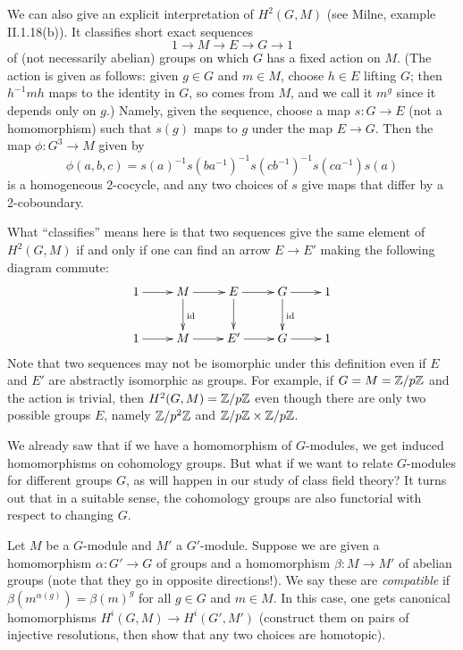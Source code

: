 
We can also give an explicit interpretation of $H^2(G,M)$ (see
Milne, example II.1.18(b)). It classifies
short exact sequences
\[
1 \to M \to E \to G \to 1
\]
of (not necessarily abelian) groups on which $G$ has a fixed action on $M$.
(The action is given as follows: given $g \in G$ and $m \in M$, choose $h
\in E$ lifting $G$; then $h^{-1}mh$ maps to the identity in $G$, so comes
from $M$, and we call it $m^g$ since it depends only on $g$.)
Namely, given the sequence, choose a map $s: G \to E$ (not a homomorphism)
such that $s(g)$ maps to $g$ under the map $E \to G$. Then the map
$\phi: G^3 \to M$ given by
\[
\phi(a,b,c) = s(a)^{-1} s(ba^{-1})^{-1} s(cb^{-1})^{-1} s(ca^{-1}) s(a)
\]
is a homogeneous 2-cocycle, and any two choices of $s$ give maps that differ by
a 2-coboundary.

What ``classifies'' means here is that two sequences give the same
element of $H^2(G,M)$ if and only if one can find an arrow $E \to E'$ making
the following diagram commute:
\[
\xymatrix{
1 \ar[r] & M \ar^{\id}[d] \ar[r] & E \ar[d] \ar[r] & G \ar^{\id}[d] \ar[r] &
1 \\
1 \ar[r] & M \ar[r] & E' \ar[r] & G \ar[r] & 1
}
\]
Note that two sequences may not be isomorphic under this definition even
if $E$ and $E'$ are abstractly isomorphic as groups. For example, if
$G = M = \mathbb{Z}/p\mathbb{Z}$ and the action is trivial, then $H^2(G, M) = \mathbb{Z}/p\mathbb{Z}$
even though there are only two possible groups $E$, namely $\mathbb{Z}/p^2\mathbb{Z}$
and $\mathbb{Z}/p\mathbb{Z} \times \mathbb{Z}/p\mathbb{Z}$.


We already saw that if we have a homomorphism of $G$-modules, we get
induced homomorphisms on cohomology groups.
 But what if we want to relate $G$-modules for different groups $G$,
as will happen in our study of class field theory? It turns out that in
a suitable sense, the cohomology groups are also functorial with respect to changing $G$.

Let $M$ be a $G$-module and $M'$ a $G'$-module. Suppose we are given
a homomorphism $\alpha: G' \to G$ of groups and a homomorphism
$\beta: M \to M'$ of abelian groups (note that they go in opposite
directions!). We say these are \emph{compatible} if
$\beta(m^{\alpha(g)}) = \beta(m)^g$ for all $g \in G$ and $m \in M$.
In this case, one gets canonical homomorphisms $H^i(G, M) \to H^i(G', M')$
(construct them on pairs of injective
resolutions, then show that any two choices are homotopic).

